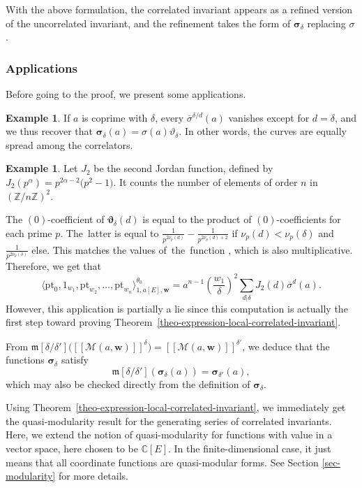 \documentclass[pdftex]{sigma}
\newcommand{\fvir}[2]{[\![ #1 ]\!]^{#2}}
\newcommand{\pt}{\mathrm{pt}}
\newcommand{\m}[1]{\mfk\left[ #1 \right]}
\newcommand{\ZZ}{\mathbb{Z}}
\newcommand{\CC}{\mathbb{C}}
\newcommand{\bfw}{ {\boldsymbol w} }
\newcommand{\mfk}{\mathfrak{m}}
\newcommand{\M}{\mathcal{M}}
\numberwithin{equation}{section}
\theoremstyle{definition}
\newtheorem{expl}[theo]{Example}
\begin{document}
With the above formulation, the correlated invariant appears as a refined version of the uncorrelated invariant, and the refinement takes the form of $\boldsymbol{\sigma}_\delta$ replacing $\sigma$.


\subsubsection{Applications} Before going to the proof, we present some applications.

\begin{expl}
 If $a$ is coprime with $\delta$, every $\overline{\sigma}^{\delta/d}(a)$ vanishes except for $d=\delta$, and we thus recover that
$\boldsymbol{\sigma}_\delta(a) = \sigma(a)\vartheta_\delta$.
 In other words, the curves are equally spread among the correlators.
\end{expl}

\begin{expl}
 Let $J_2$ be the second Jordan function, defined by $J_2(p^\alpha)=p^{2\alpha-2}\bigl(p^2-1\bigr)$. It counts the number of elements of order $n$ in $(\ZZ/n\ZZ)^2$.

 The $(0)$-coefficient of $\boldsymbol{\vartheta}_\delta(d)$ is equal to the product of $(0)$-coefficients for each prime $p$. The~latter is equal to $\frac{1}{p^{2\nu_p(d)}}\!-\!\frac{1}{p^{2\nu_p(d)+2}}$ if $\nu_p(d)\!<\!\nu_p(\delta)$ and $\frac{1}{p^{2\nu_p(\delta)}}$ else. This matches the values of~the~function , which is also multiplicative. Therefore,
 we get that
 \[ \langle \pt_0,1_{w_1},\pt_{w_2},\dots,\pt_{w_n}\rangle^{\theta_0}_{1,a[E],\bfw} =a^{n-1}\left(\frac{w_1}{\delta}\right)^2\sum_{d|\delta}J_2(d)\overline{\sigma}^d(a). \]
 However, this application is partially a lie since this computation is actually the first step toward proving Theorem~\ref{theo-expression-local-correlated-invariant}.
\end{expl}

From $\m{\delta/\delta'}\bigl(\fvir{\M(a,\bfw)}{\delta}\bigr) = \fvir{\M(a,\bfw)}{\delta'}$, we deduce that the functions $\boldsymbol{\sigma}_\delta$ satisfy
\[ \m{\delta/\delta'}(\boldsymbol{\sigma}_\delta(a)) = \boldsymbol{\sigma}_{\delta'}(a),\]
which may also be checked directly from the definition of $\boldsymbol{\sigma}_\delta$.

Using Theorem~\ref{theo-expression-local-correlated-invariant}, we immediately get the quasi-modularity result for the generating series of correlated invariants. Here, we extend the notion of quasi-modularity for functions with value in a vector space, here chosen to be $\CC[E]$. In the finite-dimensional case, it just means that all coordinate functions are quasi-modular forms. See Section \ref{sec-modularity} for more details.
\end{document}
